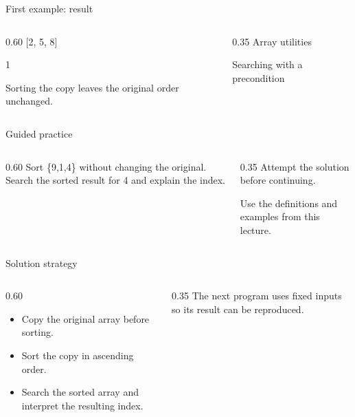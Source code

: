 \documentclass[10pt,aspectratio=169]{beamer}
\begin{document}
\begin{frame}[fragile,t]{First example: result}
\begin{columns}[T,onlytextwidth]\begin{column}{0.60\textwidth}
[2, 5, 8]\par 1\par [8, 2, 5]\par Sorting the copy leaves the original order unchanged.
\end{column}\begin{column}{0.35\textwidth}\small
Array utilities

Searching with a precondition
\end{column}\end{columns}
\end{frame}

\begin{frame}[fragile,t]{Guided practice}
\begin{columns}[T,onlytextwidth]\begin{column}{0.60\textwidth}
Sort \{9,1,4\} without changing the original. Search the sorted result for 4 and explain the index.
\end{column}\begin{column}{0.35\textwidth}\small
Attempt the solution before continuing.

Use the definitions and examples from this lecture.
\end{column}\end{columns}
\end{frame}

\begin{frame}[fragile,t]{Solution strategy}
\begin{columns}[T,onlytextwidth]\begin{column}{0.60\textwidth}
\begin{itemize}
\item Copy the original array before sorting.
\item Sort the copy in ascending order.
\item Search the sorted array and interpret the resulting index.
\end{itemize}
\end{column}\begin{column}{0.35\textwidth}\small
The next program uses fixed inputs so its result can be reproduced.
\end{column}\end{columns}
\end{frame}
\end{document}
